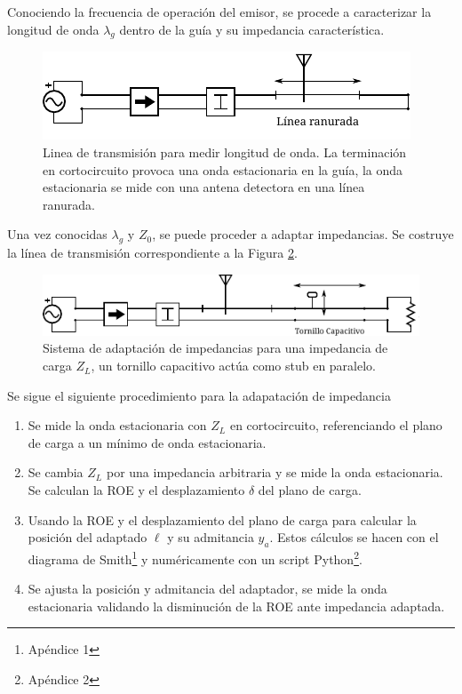 \documentclass[11pt,a4paper]{article}
\begin{document}
\begin{multicols}{2}
Conociendo la frecuencia de operación del emisor, se procede a caracterizar la longitud de onda $\lambda_g$ dentro de la guía y su impedancia característica. 
\begin{figure}[H]
    \centering
    \includegraphics[width=\linewidth]{Images/arreglo2.pdf}
    \caption{Linea de transmisión para medir longitud de onda. La terminación en cortocircuito provoca una onda estacionaria en la guía, la onda estacionaria se mide con una antena detectora en una línea ranurada.}
    \label{fig:arr2}
\end{figure}

Una vez conocidas $\lambda_g$ y $Z_0$, se puede proceder a adaptar impedancias. Se costruye la línea de transmisión correspondiente a la Figura \ref{fig:arr4}.

\begin{figure}[H]
    \centering
    \includegraphics[width=\linewidth]{Images/arreglo4.pdf}
    \caption{Sistema de adaptación de impedancias para una impedancia de carga $Z_L$, un tornillo capacitivo actúa como stub en paralelo.}
    \label{fig:arr4}
\end{figure}

Se sigue el siguiente procedimiento para la adapatación de impedancia

\begin{enumerate}
    \item Se mide la onda estacionaria con $Z_L$ en cortocircuito, referenciando el plano de carga a un mínimo de onda estacionaria.
    \item Se cambia $Z_L$ por una impedancia arbitraria y se mide la onda estacionaria. Se calculan la ROE y el desplazamiento $\delta$ del plano de carga.
    \item Usando la ROE y el desplazamiento del plano de carga para calcular la posición del adaptado $\ell$ y su admitancia $y_a$. 
    Estos cálculos se hacen con el diagrama de Smith\footnote{Apéndice 1} y numéricamente con un script Python\footnote{Apéndice 2}.
    \item Se ajusta la posición y admitancia del adaptador, se mide la onda estacionaria validando la disminución de la ROE ante impedancia adaptada.
\end{enumerate}


\end{multicols}
\end{document}
